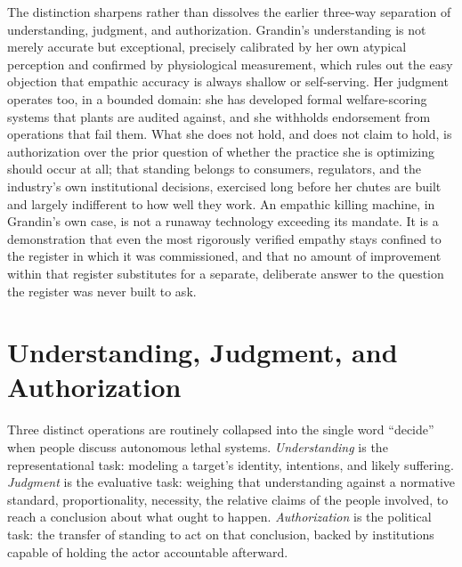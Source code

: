 \documentclass[11pt]{article}
\begin{document}
The distinction sharpens rather than dissolves the earlier three-way separation of understanding, judgment, and authorization. Grandin's understanding is not merely accurate but exceptional, precisely calibrated by her own atypical perception and confirmed by physiological measurement, which rules out the easy objection that empathic accuracy is always shallow or self-serving. Her judgment operates too, in a bounded domain: she has developed formal welfare-scoring systems that plants are audited against, and she withholds endorsement from operations that fail them. What she does not hold, and does not claim to hold, is authorization over the prior question of whether the practice she is optimizing should occur at all; that standing belongs to consumers, regulators, and the industry's own institutional decisions, exercised long before her chutes are built and largely indifferent to how well they work. An empathic killing machine, in Grandin's own case, is not a runaway technology exceeding its mandate. It is a demonstration that even the most rigorously verified empathy stays confined to the register in which it was commissioned, and that no amount of improvement within that register substitutes for a separate, deliberate answer to the question the register was never built to ask.

\section{Understanding, Judgment, and Authorization}

Three distinct operations are routinely collapsed into the single word ``decide'' when people discuss autonomous lethal systems. \emph{Understanding} is the representational task: modeling a target's identity, intentions, and likely suffering. \emph{Judgment} is the evaluative task: weighing that understanding against a normative standard, proportionality, necessity, the relative claims of the people involved, to reach a conclusion about what ought to happen. \emph{Authorization} is the political task: the transfer of standing to act on that conclusion, backed by institutions capable of holding the actor accountable afterward.
\end{document}
